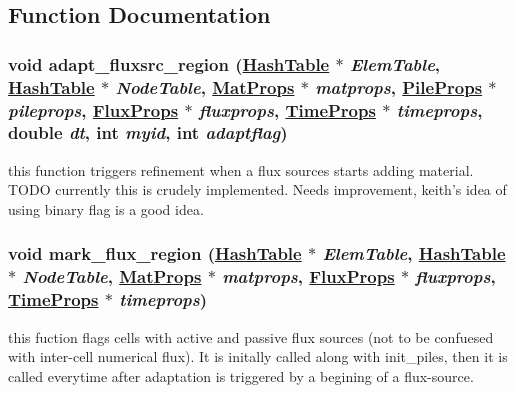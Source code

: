 \subsection{Function Documentation}
\hypertarget{flux__srcs_8C_a1}{
\subsubsection[adapt\_\-fluxsrc\_\-region]{\setlength{\rightskip}{0pt plus 5cm}void adapt\_\-fluxsrc\_\-region (\hyperlink{classHashTable}{Hash\-Table} $\ast$ {\em Elem\-Table}, \hyperlink{classHashTable}{Hash\-Table} $\ast$ {\em Node\-Table}, \hyperlink{structMatProps}{Mat\-Props} $\ast$ {\em matprops}, \hyperlink{structPileProps}{Pile\-Props} $\ast$ {\em pileprops}, \hyperlink{structFluxProps}{Flux\-Props} $\ast$ {\em fluxprops}, \hyperlink{structTimeProps}{Time\-Props} $\ast$ {\em timeprops}, double {\em dt}, int {\em myid}, int {\em adaptflag})}}
\label{flux__srcs_8C_a1}


this function triggers refinement when a flux sources starts adding material. TODO currently this is crudely implemented. Needs improvement, keith's idea of using binary flag is a good idea. 

\hypertarget{flux__srcs_8C_a0}{
\subsubsection[mark\_\-flux\_\-region]{\setlength{\rightskip}{0pt plus 5cm}void mark\_\-flux\_\-region (\hyperlink{classHashTable}{Hash\-Table} $\ast$ {\em Elem\-Table}, \hyperlink{classHashTable}{Hash\-Table} $\ast$ {\em Node\-Table}, \hyperlink{structMatProps}{Mat\-Props} $\ast$ {\em matprops}, \hyperlink{structFluxProps}{Flux\-Props} $\ast$ {\em fluxprops}, \hyperlink{structTimeProps}{Time\-Props} $\ast$ {\em timeprops})}}
\label{flux__srcs_8C_a0}


this fuction flags cells with active and passive flux sources (not to be confuesed with inter-cell numerical flux). It is initally called along with init\_\-piles, then it is called everytime after adaptation is triggered by a begining of a flux-source. 

